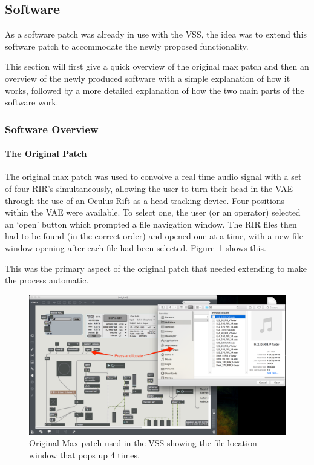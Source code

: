 \documentclass[../../main.tex]{subfiles}
\begin{document}
\lstset{language=Java} 
	\subsection{Software}
		
		As a software patch was already in use with the \ac{VSS}, the idea was to extend this software patch to accommodate the newly proposed functionality.

		This section will first give a quick overview of the original max patch and then an overview of the newly produced software with a simple explanation of how it works, followed by a more detailed explanation of how the two main parts of the software work.

		\subsubsection{Software Overview}

			\paragraph{The Original Patch}
			\label{softwareoverview:original}
				The original max patch was used to convolve a real time audio signal with a set of four \ac{RIR}'s simultaneously, allowing the user to turn their head in the \ac{VAE} through the use of an Oculus Rift as a head tracking device. Four positions within the \ac{VAE} were available. To select one, the user (or an operator) selected an `open' button which prompted a file navigation window. The \ac{RIR} files then had to be found (in the correct order) and opened one at a time, with a new file window opening after each file had been selected. Figure~\ref{original} shows this.

				This was the primary aspect of the original patch that needed extending to make the process automatic.

				\begin{figure}[H]
					\centerline{\includegraphics[scale = 0.4]{Sections/Implementation/Max/images/Max/OriginalPatch_Edit.png}}
					\caption{Original Max patch used in the \ac{VSS} showing the file location window that pops up 4 times.}
					\label{original}
				\end{figure}
\end{document}

